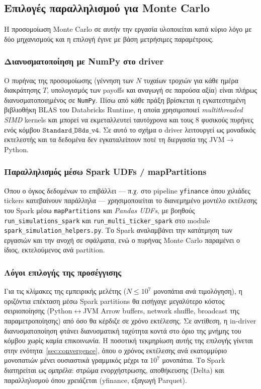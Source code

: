 \documentclass[12pt]{article}
\begin{document}
\subsection{Επιλογές παραλληλισμού για Monte Carlo}
Η προσομοίωση Monte Carlo σε αυτήν την εργασία υλοποιείται κατά κύριο λόγο με δύο μηχανισμούς και η επιλογή έγινε με βάση μετρήσιμες παραμέτρους.

\subsubsection{Διανυσματοποίηση με NumPy στο driver}
Ο πυρήνας της προσομοίωσης (γέννηση των $N$ τυχαίων τροχιών για κάθε ημέρα διακράτησης $T$, υπολογισμός των payoffs και αναγωγή σε παρούσα αξία) είναι πλήρως διανυσματοποιημένος σε \texttt{NumPy}. Πίσω από κάθε πράξη βρίσκεται η εγκατεστημένη βιβλιοθήκη BLAS του Databricks Runtime, η οποία χρησιμοποιεί \emph{multithreaded SIMD} kernels και μπορεί να εκμεταλλευτεί ταυτόχρονα και τους $8$ φυσικούς πυρήνες ενός κόμβου $\texttt{Standard\_D8ds\_v4}$. Σε αυτό το σχήμα ο driver λειτουργεί ως μοναδικός εκτελεστής και τα δεδομένα δεν εγκαταλείπουν ποτέ τη διεργασία της JVM\(\to\)Python.

\subsubsection{Παραλληλισμός μέσω Spark UDFs / mapPartitions}
Όπου ο όγκος δεδομένων το επιβάλλει — π.χ. στο pipeline \texttt{yfinance} όπου χιλιάδες tickers κατεβαίνουν παράλληλα — χρησιμοποιείται το διανεμημένο μοντέλο εκτέλεσης του Spark μέσω \texttt{mapPartitions} και \emph{Pandas UDFs}, με βοηθούς \texttt{run\_simulations\_spark} και \texttt{run\_multi\_ticker\_spark} στο module \texttt{spark\_simulation\_helpers.py}. Το Spark αναλαμβάνει την κατάτμηση των εργασιών και την ανοχή σε σφάλματα, ενώ ο πυρήνας Monte Carlo παραμένει ο ίδιος, εκτελούμενος ανά partition.

\subsubsection{Λόγοι επιλογής της προσέγγισης}
Για τις κλίμακες της εμπειρικής μελέτης ($N \leq 10^7$ μονοπάτια ανά τιμολόγηση), η οριζόντια επέκταση μέσω Spark partitions θα εισήγαγε μεγαλύτερο κόστος σειριοποίησης (Python$\leftrightarrow$JVM Arrow buffers, network shuffle, broadcast της παραμετροποίησης) από όσο θα κέρδιζε σε χρόνο εκτέλεσης. Σε αντίθεση, η in-driver διανυσματοποίηση φτάνει διανυσματική ταχύτητα κοντά στο όριο της μνήμης του κόμβου χωρίς καμία επικοινωνία. Η ποσοτική τεκμηρίωση αυτής της επιλογής γίνεται στην ενότητα~\ref{sec:convergence}, όπου ο χρόνος εκτέλεσης ανά εκατομμύριο μονοπατιών μένει ουσιαστικά γραμμικός μέχρι τα $10^7$ μονοπάτια. Το Spark διατηρείται ως \emph{ομπρέλα}: στρώμα ενορχήστρωσης, αποθήκευσης (Delta) και παραλληλισμού όπου χρειάζεται (yfinance, εξαγωγή Parquet).
\end{document}
